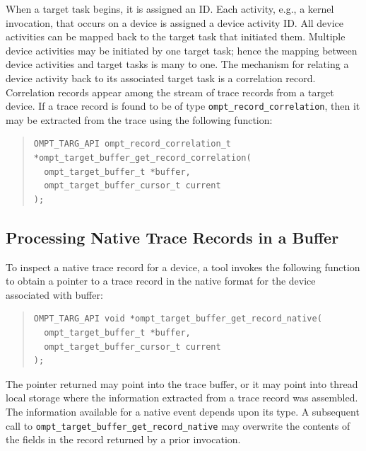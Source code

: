 \documentclass{article}
\begin{document}
When a target task begins, it is assigned an ID. Each activity, e.g., a kernel invocation, that occurs on a device is assigned a device activity ID. All device activities can be mapped back to the target task that initiated them.  Multiple device activities may be initiated by one target task; hence the mapping between device activities and target tasks is many to one. The mechanism for relating a device activity back to its associated target task is a correlation record. Correlation records appear among the stream of trace records from a target device. If a trace record is found to be of type \verb|ompt_record_correlation|, then it may be extracted from the trace using the following function:

\begin{quote}
\begin{verbatim}
OMPT_TARG_API ompt_record_correlation_t *ompt_target_buffer_get_record_correlation(
  ompt_target_buffer_t *buffer, 
  ompt_target_buffer_cursor_t current
);
\end{verbatim}
\end{quote}

\subsection{Processing Native Trace Records in a Buffer}
\label{sec:native-record-data}

To inspect a native trace record for a device, a tool invokes the following function to obtain a pointer to a trace record in the native format for the device associated with buffer:
\begin{quote}
\begin{verbatim}
OMPT_TARG_API void *ompt_target_buffer_get_record_native(
  ompt_target_buffer_t *buffer, 
  ompt_target_buffer_cursor_t current
);
\end{verbatim}
\end{quote}
The pointer returned  may point into the trace buffer, or it may point into thread local storage where the information extracted from a trace record was assembled. The information available for a native event depends upon its type. 
A subsequent call to \verb|ompt_target_buffer_get_record_native| may overwrite the contents of the fields in the record returned by a prior invocation.
\end{document}
